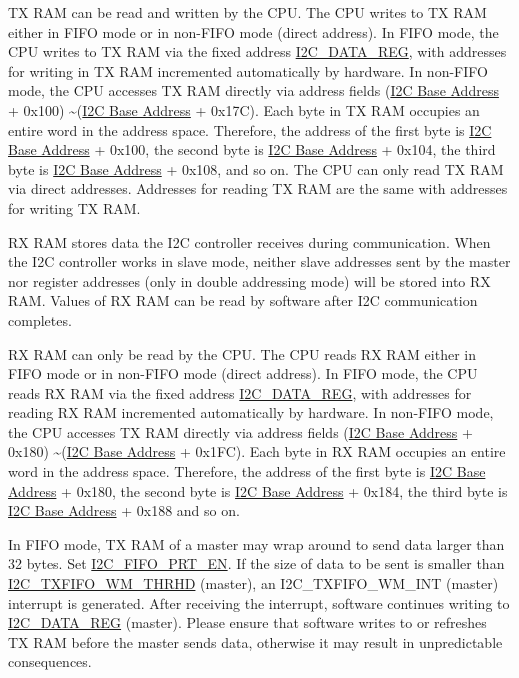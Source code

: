 \documentclass[main\_\_EN.tex]{subfiles}
\begin{document}
TX RAM can be read and written by the CPU. The CPU writes to TX RAM either in FIFO mode or in non-FIFO mode (direct address). In FIFO mode, the CPU writes to TX RAM via the fixed address \hyperref[regdesc:I2CDATAREG]{I2C\_DATA\_REG}, with addresses for writing in TX RAM incremented automatically by hardware. In non-FIFO mode, the CPU accesses TX RAM directly via address fields (\hyperref[tab:sysmem-base-address]{I2C Base Address} + 0x{}100) \textasciitilde (\hyperref[tab:sysmem-base-address]{I2C Base Address} + 0x{}17C). Each byte in TX RAM occupies an entire word in the address space. Therefore, the address of the first byte is \hyperref[tab:sysmem-base-address]{I2C Base Address} + 0x{}100, the second byte is \hyperref[tab:sysmem-base-address]{I2C Base Address} + 0x{}104, the third byte is \hyperref[tab:sysmem-base-address]{I2C Base Address} + 0x{}108, and so on. The CPU can only read TX RAM via direct addresses.
Addresses for reading TX RAM are the same with addresses for writing TX RAM.

RX RAM stores data the I2C controller receives during communication. When the I2C controller works in slave mode, neither slave addresses sent by the master nor register addresses (only in double addressing mode) will be stored into RX RAM. Values of RX RAM can be read by software after I2C communication completes.

RX RAM can only be read by the CPU. The CPU reads RX RAM either in FIFO mode or in non-FIFO mode (direct address). In FIFO mode, the CPU reads RX RAM via the fixed address \hyperref[regdesc:I2CDATAREG]{I2C\_DATA\_REG}, with addresses for reading RX RAM incremented automatically by hardware. In non-FIFO mode, the CPU accesses TX RAM directly via address fields (\hyperref[tab:sysmem-base-address]{I2C Base Address} + 0x{}180) \textasciitilde (\hyperref[tab:sysmem-base-address]{I2C Base Address} + 0x{}1FC). Each byte in RX RAM occupies an entire word in the address space. Therefore, the address of the first byte is \hyperref[tab:sysmem-base-address]{I2C Base Address} + 0x{}180, the second byte is \hyperref[tab:sysmem-base-address]{I2C Base Address} + 0x{}184, the third byte is \hyperref[tab:sysmem-base-address]{I2C Base Address} + 0x{}188 and so on.

In FIFO mode, TX RAM of a master may wrap around to send data larger than 32 bytes. Set \hyperref[fielddesc:I2CFIFOPRTEN]{I2C\_FIFO\_PRT\_EN}. If the size of data to be sent is smaller than \hyperref[fielddesc:I2CTXFIFOWMTHRHD]{I2C\_TXFIFO\_WM\_THRHD} (master), an I2C\_TXFIFO\_WM\_INT (master) interrupt is generated. After receiving the interrupt, software continues writing to \hyperref[regdesc:I2CDATAREG]{I2C\_DATA\_REG} (master). Please ensure that software writes to or refreshes TX RAM before the master sends data, otherwise it may result in unpredictable consequences.
\end{document}
